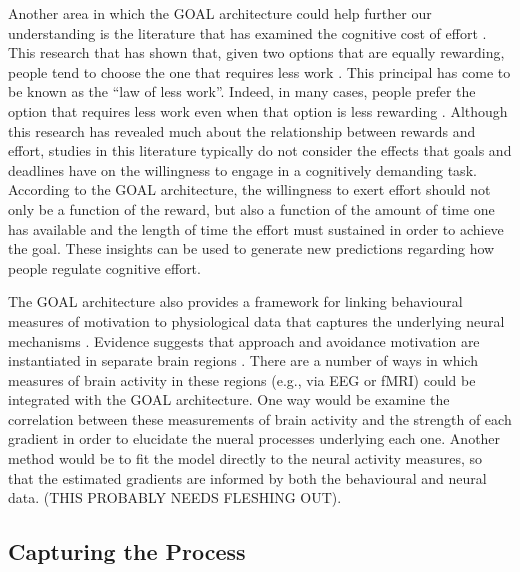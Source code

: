 \documentclass[a4paper,doc,natbib,donotrepeattitle]{apa6}
\begin{document}
Another area in which the GOAL architecture could help further our understanding is the literature that has examined the cognitive cost of effort \citep[e.g.,][]{Westbrook2013,Westbrook2015}. This research that has shown that, given two options that are equally rewarding, people tend to choose the one that requires less work \citep{Kool2010,Inzlicht2018}. This principal has come to be known as the ``law of less work''. Indeed, in many cases, people prefer the option that requires less work even when that option is less rewarding \citep[a phenomeon known as ``effort discounting'';][]{Botvinick2009,Libedinsky2013}. Although this research has revealed much about the relationship between rewards and effort, studies in this literature typically do not consider the effects that goals and deadlines have on the willingness to engage in a cognitively demanding task. According to the GOAL architecture, the willingness to exert effort should not only be a function of the reward, but also a function of the amount of time one has available and the length of time the effort must sustained in order to achieve the goal. These insights can be used to generate new predictions regarding how people regulate cognitive effort.

The GOAL architecture also provides a framework for linking behavioural measures of motivation to physiological data that captures the underlying neural mechanisms \citep[e.g.,][]{Turner2016,Palmeri2017,Palestro2018}. Evidence suggests that approach and avoidance motivation are instantiated in separate brain regions \citep{Wager2003,Rutherford2011}. There are a number of ways in which measures of brain activity in these regions (e.g., via EEG or fMRI) could be integrated with the GOAL architecture. One way would be examine the correlation between these measurements of brain activity and the strength of each gradient in order to elucidate the nueral processes underlying each one. Another method would be to fit the model directly to the neural activity measures, so that the estimated gradients are informed by both the behavioural and neural data. (THIS PROBABLY NEEDS FLESHING OUT).

\subsection{Capturing the Process}
\end{document}

